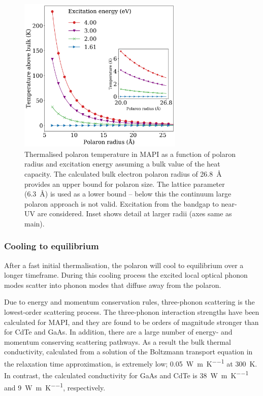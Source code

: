 \begin{figure}[h]
\centering
  \includegraphics[width=0.7\textwidth]{figures/ch5/f3.png}
  \caption[Polaron temperature as a function of polaron radius]{Thermalised polaron temperature in MAPI as a function of polaron radius and excitation energy assuming a bulk value of the heat capacity. The calculated bulk electron polaron radius of \SI{26.8}{\angstrom} provides an upper bound for polaron size. The lattice parameter (\SI{6.3}{\angstrom}) is used as a lower bound -- below this the continuum large polaron approach is not valid. Excitation from the bandgap to near-UV are considered. Inset shows detail at larger radii (axes same as main). }
  \label{ch5TemperatureRadius}
\end{figure}


\subsubsection{Cooling to equilibrium}
After a fast initial thermalisation, the polaron will cool to equilibrium over a longer timeframe. During this cooling process the excited local optical phonon modes scatter into phonon modes that diffuse away from the polaron.

Due to energy and momentum conservation rules, three-phonon scattering is the lowest-order scattering process.  The three-phonon interaction strengths have been calculated for MAPI,\autocite{Whalley2016} and they are found to be orders of magnitude stronger than for CdTe and GaAs. In addition, there are a large number of energy- and momentum conserving scattering pathways. As a result the bulk thermal conductivity, calculated from a solution of the Boltzmann transport equation in the relaxation time approximation, is extremely low; \SI{0.05}{\watt\per\metre\per\K} at \SI{300}{\K}.\autocite{Whalley2016} 
In contrast, the calculated conductivity for GaAs and CdTe is 
\SI{38}{\watt\per\metre\per\K}
and
\SI{9}{\watt\per\metre\per\K},
respectively.

